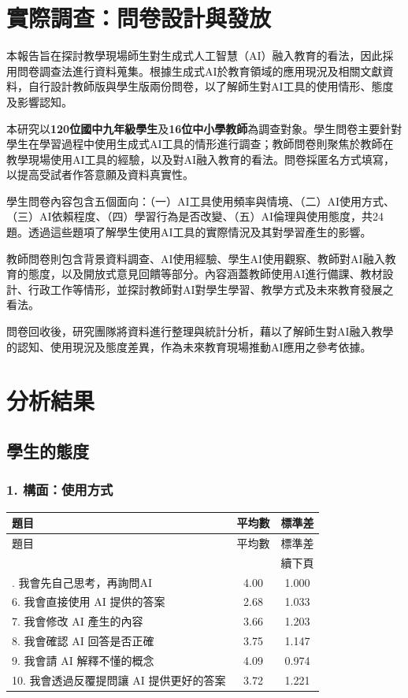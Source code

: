 \section{實際調查：問卷設計與發放}\label{sec:問卷設計}

本報告旨在探討教學現場師生對生成式人工智慧（AI）融入教育的看法，因此採用問卷調查法進行資料蒐集。根據生成式AI於教育領域的應用現況及相關文獻資料，自行設計教師版與學生版兩份問卷，以了解師生對AI工具的使用情形、態度及影響認知。

本研究以\textbf{120位國中九年級學生}及\textbf{16位中小學教師}為調查對象。學生問卷主要針對學生在學習過程中使用生成式AI工具的情形進行調查；教師問卷則聚焦於教師在教學現場使用AI工具的經驗，以及對AI融入教育的看法。問卷採匿名方式填寫，以提高受試者作答意願及資料真實性。

學生問卷內容包含五個面向：（一）AI工具使用頻率與情境、（二）AI使用方式、（三）AI依賴程度、（四）學習行為是否改變、（五）AI倫理與使用態度，共24題。透過這些題項了解學生使用AI工具的實際情況及其對學習產生的影響。

教師問卷則包含背景資料調查、AI使用經驗、學生AI使用觀察、教師對AI融入教育的態度，以及開放式意見回饋等部分。內容涵蓋教師使用AI進行備課、教材設計、行政工作等情形，並探討教師對AI對學生學習、教學方式及未來教育發展之看法。

問卷回收後，研究團隊將資料進行整理與統計分析，藉以了解師生對AI融入教學的認知、使用現況及態度差異，作為未來教育現場推動AI應用之參考依據。

\section{分析結果}\label{sec:分析結果}

\subsection{學生的態度}\label{sec:學生態度}

\subsubsection{1. 構面：使用方式}

\begin{longtable}{l c c}
\toprule
題目 & 平均數 & 標準差 \\
\midrule
\endfirsthead
\toprule
題目 & 平均數 & 標準差 \\
\midrule
\endhead
\midrule
\multicolumn{3}{r}{續下頁} \\
\endfoot
\bottomrule
\endlastfoot
5. 我會先自己思考，再詢問AI & 4.00 & 1.000 \\
6. 我會直接使用 AI 提供的答案 & 2.68 & 1.033 \\
7. 我會修改 AI 產生的內容 & 3.66 & 1.203 \\
8. 我會確認 AI 回答是否正確 & 3.75 & 1.147 \\
9. 我會請 AI 解釋不懂的概念 & 4.09 & 0.974 \\
10. 我會透過反覆提問讓 AI 提供更好的答案 & 3.72 & 1.221 \\
\end{longtable}

